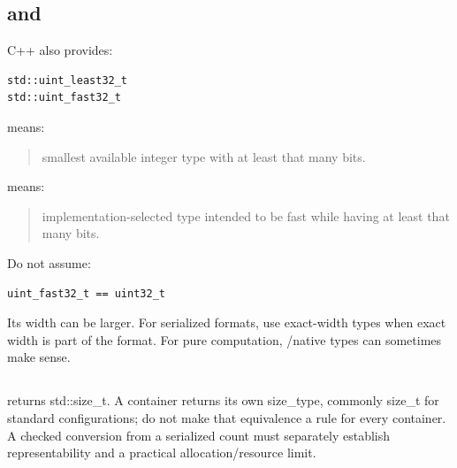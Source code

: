 \subsection{\texorpdfstring{ and }{ and }}\label{01-foundations-i-ch002-least-and-fast}

\hypertarget{01-foundations-i-ch002-least-and-fast}{}

C++ also provides:

\begin{verbatim}
std::uint_least32_t
std::uint_fast32_t
\end{verbatim}

 means:

\begin{quote}
smallest available integer type with at least that many bits.
\end{quote}

 means:

\begin{quote}
implementation-selected type intended to be fast while having at least that many bits.
\end{quote}

Do not assume:

\begin{verbatim}
uint_fast32_t == uint32_t
\end{verbatim}

Its width can be larger. For serialized formats, use exact-width types when exact width is part of the format. For pure computation, /native types can sometimes make sense.

\subsection{\texorpdfstring{}{}}\label{01-foundations-i-ch002-stdsize_t}

\hypertarget{01-foundations-i-ch002-stdsize_t}{}

 returns std::size\_t. A container returns its own size\_type, commonly size\_t for standard configurations; do not make that equivalence a rule for every container. A checked conversion from a serialized count must separately establish representability and a practical allocation/resource limit.

